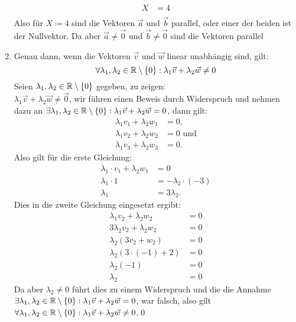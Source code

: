 \documentclass[sectionformat = aufgabe]{gadsescript}
\begin{document}
\begin{enumerate}[label=\alph*)]
\begin{align*}
			X &= 4\\
		\end{align*}
		Also für $ X \coloneqq 4 $ sind die Vektoren $\vec a $ und $ \vec b $ parallel, oder einer der beiden ist der Nullvektor. Da aber $ \vec a \neq \vec0 $ und $ \vec b \neq \vec0 $ sind die Vektoren parallel
	\item Genau dann, wenn die Vektoren $ \vec v $ und $ \vec w $ linear unabhängig sind, gilt:
		\[ \forall \lambda_1,\lambda_2 \in \mathbb{R}\setminus\{0\} : \lambda_1\vec v + \lambda_2\vec w \neq 0 \]
		Seien $ \lambda_1, \lambda_2 \in \mathbb{R}\setminus\{0\} $ gegeben, zu zeigen:\\
		$\lambda_1 \vec v + \lambda_2 \vec w \neq \vec 0 $, wir führen einen Beweis durch Widerspruch und nehmen dazu an $ \exists\lambda_1,\lambda_2\in\mathbb{R}\setminus\{0\}:\lambda_1\vec v+\lambda_2\vec w = 0$, dann gilt:
		\begin{align*}
			\lambda_1v_1 + \lambda_2w_1 &= 0,\\
			\lambda_1v_2 + \lambda_2w_2 &= 0 \text{ und}\\
			\lambda_1v_3 + \lambda_2w_3 &= 0.
		\end{align*}
		Also gilt für die erste Gleichung:
		\begin{align*}
			\lambda_1\cdot v_1 + \lambda_2w_1 &= 0\\
			\lambda_1 \cdot 1 &= -\lambda_2\cdot (-3)\\
			\lambda_1 &= 3\lambda_2.
		\end{align*}
		Dies in die zweite Gleichung eingesetzt ergibt:
		\begin{align*}
			\lambda_1v_2 + \lambda_2w_2 &= 0 \\
			3\lambda_2v_2 + \lambda_2w_2 &= 0 \\
			\lambda_2\left(3v_2 + w_2\right) &= 0 \\
			\lambda_2\left(3 \cdot (-1) + 2\right) &= 0 \\
			\lambda_2\left(-1\right) &= 0 \\
			\lambda_2 &= 0
		\end{align*}
		Da aber $ \lambda_2 \neq 0 $ führt dies zu einem Widerspruch und die die Annahme $ \exists\lambda_1,\lambda_2\in\mathbb{R}\setminus\{0\}:\lambda_1\vec v+\lambda_2\vec w = 0$, war falsch, also gilt $\forall \lambda_1,\lambda_2 \in \mathbb{R}\setminus\{0\} : \lambda_1\vec v + \lambda_2\vec w \neq 0 $.\qed
\end{enumerate}
\end{document}
